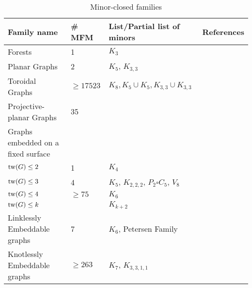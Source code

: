 \begin{table}[h!]
    
    \centering
    \caption{Minor-closed families}\label{tab:minor-closed families}
    \begin{tabular*}{\textwidth}{@{}llll@{}}
    \toprule
    Family name                  & \# MFM & List/Partial list of minors                      & References \\ \midrule
    Forests                      & 1                                  & $K_3$                                            &            \\
    Planar Graphs                & 2                                  & $K_5$, $K_{3,3}$                                 & \tablefootnote{\textcite{wagnerUeberEigenschaftEbenen1937}}           \\
    Toroidal Graphs              & $\geq 17523$                       & $K_8, K_5 \cup K_5, K_{3,3} \cup K_{3,3}$        & \tablefootnote{\textcite{myrvoldLargeSetTorus2018}}           \\
    Projective-planar Graphs     & 35                                 &                                   & \tablefootnote{\textcite{archdeaconKuratowskiTheoremProjective1980}}           \\
    Graphs embedded on a fixed surface                      & & &\\
    $\operatorname{tw}(G) \leq 2$              & 1                                  & $K_4$                                            &            \\
    $\operatorname{tw}(G) \leq 3$              & 4                                  & $K_5$, $K_{2,2,2}$, $P_2 \square C_5$, $V_8$ & \tablefootnote{\textcite{arnborgForbiddenMinorsCharacterization1990}}           \\
    $\operatorname{tw}(G) \leq 4$              & $\geq 75$                          & $K_6$                                            & \tablefootnote{\textcite{sandersLinearAlgorithmsGraphs1993}}           \\
    $\operatorname{tw}(G) \leq k$              &                                    & $K_{k + 2}$                                      &            \\
    Linklessly Embeddable graphs & 7                                  & $K_6$, Petersen Family                           & \tablefootnote{\textcite{robertsonLinklessEmbeddingsGraphs1993}} \\
    Knotlessly Embeddable graphs & $\geq 263$                           & $K_7$, $K_{3,3,1,1}$                                            & \tablefootnote{\textcite{conwayKnotsLinksSpatial1983,foisyIntrinsicallyKnottedGraphs2002,foisyNewlyRecognizedIntrinsically2003}}\\
    \bottomrule
    \end{tabular*}
    
\end{table}
